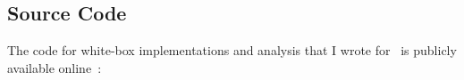 {%

\subsection*{Source Code}

The code for white-box implementations and analysis that I wrote for~ is publicly available online~\cite{OurWhiteboxCode}:

 

} 